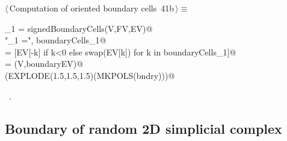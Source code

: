 \documentclass[11pt,oneside]{article}	%
\begin{document}
\begin{flushleft} \small \label{scrap86}
\protect{}$\langle\,$Computation of oriented boundary cells\nobreak\ {\footnotesize 41b}$\,\rangle\equiv$
\vspace{-1ex}
\begin{list}{}{} \item
\mbox{}\verb@boundaryCells_1 = signedBoundaryCells(V,FV,EV)@\\
\mbox{}\verb@print "\nboundaryCells_1 =\n", boundaryCells_1@\\
\mbox{}\verb@boundaryEV = [EV[-k] if k<0 else swap(EV[k]) for k in boundaryCells_1]@\\
\mbox{}\verb@bndry = (V,boundaryEV)@\\
\mbox{}\verb@VIEW(EXPLODE(1.5,1.5,1.5)(MKPOLS(bndry)))@\\
\mbox{}\verb@@{\NWsep}
\end{list}
\vspace{-1ex}
\footnotesize\addtolength{\baselineskip}{-1ex}
\begin{list}{}{\setlength{\itemsep}{-\parsep}\setlength{\itemindent}{-\leftmargin}}
\item \NWtxtMacroRefIn\ .
\end{list}
\end{flushleft}

\subsection{Boundary of random 2D simplicial complex}
\end{document}

